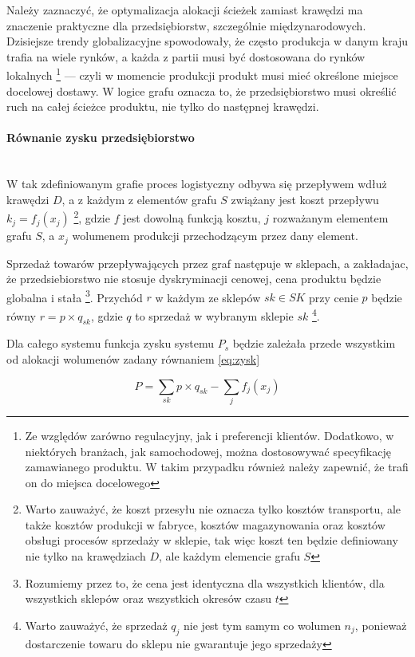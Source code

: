\documentclass[polish, twoside, 12pt, a4paper]{article}
\theoremstyle{definition}
\theoremstyle{plain}
\theoremstyle{remark}
\begin{document}
Należy zaznaczyć, że optymalizacja alokacji ścieżek zamiast krawędzi ma znaczenie praktyczne dla przedsiębiorstw, szczególnie międzynarodowych. Dzisiejsze trendy globalizacyjne spowodowały, że często produkcja w danym kraju trafia na wiele rynków, a każda z partii musi być dostosowana do rynków lokalnych \footnote{Ze względów zarówno regulacyjny, jak i preferencji klientów. Dodatkowo, w niektórych branżach, jak samochodowej, można dostosowywać specyfikację zamawianego produktu. W takim przypadku również należy zapewnić, że trafi on do miejsca docelowego} --- czyli w momencie produkcji produkt musi mieć określone miejsce docelowej dostawy. W logice grafu oznacza to, że przedsiębiorstwo musi określić ruch na całej ścieżce produktu, nie tylko do następnej krawędzi.   

\paragraph{Równanie zysku przedsiębiorstwo}\mbox{}\\

W tak zdefiniowanym grafie proces logistyczny odbywa się przepływem wdłuż krawędzi $D$, a z każdym z elementów grafu $S$ zwiążany jest koszt przepływu $k_ j = f_j(x_j)$ \footnote{Warto zauważyć, że koszt przesyłu nie oznacza tylko kosztów transportu, ale także kosztów produkcji w fabryce, kosztów magazynowania oraz kosztów obsługi procesów sprzedaży w sklepie, tak więc koszt ten będzie definiowany nie tylko na krawędziach $D$, ale każdym elemencie grafu $S$}, gdzie $f$ jest dowolną funkcją kosztu, $j$ rozważanym elementem grafu $S$, a $x_j$ wolumenem produkcji przechodzącym przez dany element. 

Sprzedaż towarów przepływających przez graf następuje w sklepach, a zakładajac, że przedsiebiorstwo nie stosuje dyskryminacji cenowej, cena produktu będzie globalna i stała \footnote{Rozumiemy przez to, że cena jest identyczna dla wszystkich klientów, dla wszystkich sklepów oraz wszystkich okresów czasu $t$}. Przychód $r$ w każdym ze sklepów $sk \in SK$ przy cenie $p$ będzie równy $r = p \times q_{sk}$, gdzie $q$ to sprzedaż w wybranym sklepie $sk$ \footnote{Warto zauważyć, że sprzedaż $q_j$ nie jest tym samym co wolumen $n_j$, ponieważ dostarczenie towaru do sklepu nie gwarantuje jego sprzedaży}. 

Dla całego systemu funkcja zysku systemu $P_s$ będzie zależała przede wszystkim od alokacji wolumenów zadany równaniem \ref{eq:zysk} 

\begin{equation} \label{eq:zysk}
P = \sum\limits_{sk} p \times q_{sk} - \sum\limits_{j} f_j(x_j)
\end{equation}
\end{document}
